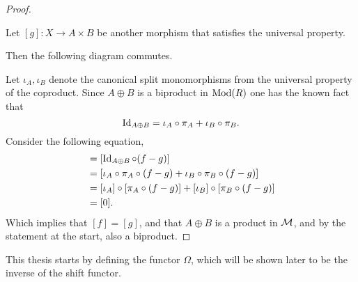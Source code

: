 \begin{proof}
\begin{center}
    \end{center}
    Let \( [g]: X \to A \times B \) be another morphism that satisfies the universal property.

    Then the following diagram commutes.
    \begin{center}
    \end{center}

    Let \( \iota_A, \iota_B \) denote the canonical split monomorphisms from the universal property of the coproduct. Since \( A \oplus B \) is a biproduct in \( \operatorname{Mod}(R) \) one has the known fact that
    \[
        \operatorname{Id}_{A \oplus B} = \iota_A \circ \pi_A + \iota_B \circ \pi_B.
    \]
    Consider the following equation,
    \begin{align*}
        [f - g] &= [\Id_{A \oplus B} \circ (f - g)] \\
        &= [\iota_A \circ \pi_A \circ (f - g) + \iota_B \circ \pi_B \circ (f - g)] \\
        &= [\iota_A] \circ [\pi_A \circ (f - g)] + [\iota_B] \circ [\pi_B \circ (f - g)] \\
        &= [0].
    \end{align*}
    Which implies that \( [f] = [g] \), and that \( A \oplus B \) is a product in \( {\mathcal{M}} \), and by the statement at the start, also a biproduct.
\end{proof}

This thesis starts by defining the functor \( \Omega \), which will be shown later to be the inverse of the shift functor.

